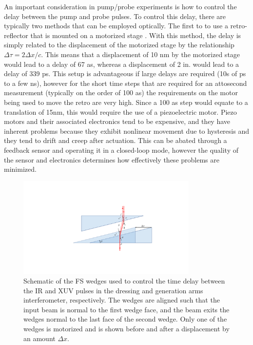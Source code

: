 An important consideration in pump/probe experiments is how to control the delay between the pump and probe pulses.  To control this delay, there are typically two methods that can be employed optically.  The first to to use a retro-reflector that is mounted on a motorized stage \cite{jagerAttosecondTransientAbsorption2018, jagerAttosecondTransientAbsorption2017, bellTransientAbsorptionSpectroscopy2013, jiangChargeCarrierDynamics2015, borjaElectronDynamicsSolids2016, chengAttoseondTransientAbsorption2015}.  With this method, the delay is simply related to the displacement of the motorized stage by the relationship $\Delta\tau = 2\Delta x/c$.  This means that a displacement of 10 nm by the motorized stage would lead to a delay of 67 as, whereas a displacement of 2 in. would lead to a delay of 339 ps. This setup is advantageous if large delays are required (10s of ps to a few ns), however for the short time steps that are required for an attosecond measurement (typically on the order of 100 as) the requirements on the motor being used to move the retro are very high.  Since a 100 as step would equate to a translation of 15nm, this would require the use of a piezoelectric motor.  Piezo motors and their associated electronics tend to be expensive, and they have inherent problems because they exhibit nonlinear movement due to hysteresis and they tend to drift and creep after actuation.  This can be abated through a feedback sensor and operating it in a closed-loop mode, however the quality of the sensor and electronics determines how effectively these problems are minimized.

\begin{figure}
	\centering
	\includegraphics[width=0.8\textwidth]{figures/Beamline/wedge_delay_calibration.pdf}
	\caption[Schematic of FS wedges used for delay control]{Schematic of the FS wedges used to control the time delay between the IR and XUV pulses in the dressing and generation arms interferometer, respectively. The wedges are aligned such that the input beam is normal to the first wedge face, and the beam exits the wedges normal to the last face of the second wedge.  Only one of the wedges is motorized and is shown before and after a displacement by an amount $\Delta x$.}
	\label{fig:wedges}
\end{figure}

